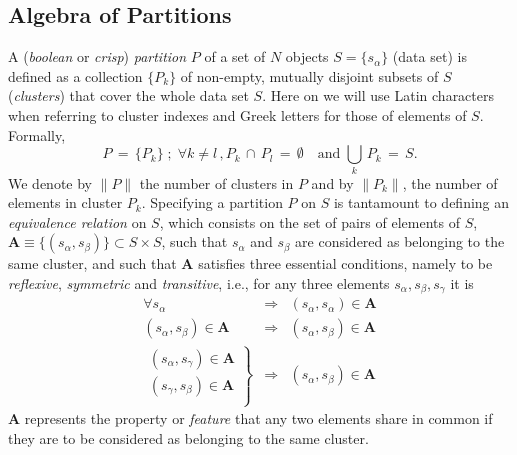 \documentclass[twocolumn,aps,sort,nofootinbib]{revtex4}
\begin{document}
\subsection{Algebra of Partitions}
A ({\it boolean} or {\it crisp}) {\it partition} $P$ 
of a set of $N$ objects $S=\{s_\alpha\}$ (data set) is defined as a collection $\{P_k\}$ of non-empty, 
mutually disjoint 
subsets of $S$ ({\sl clusters}) that cover the whole data set $S$. 
Here on we will use Latin characters when referring to
cluster indexes and Greek letters for those of elements of $S$.
Formally, 
\begin{equation*}
P\,=\,\{P_k\}\; ;\;\forall k\neq l\,, P_k\,\cap\,P_l\,=\,\emptyset\quad \text{and} \; \bigcup_k\,P_k\,=\,S.
\end{equation*}
We denote by $\|P\|$ the number of clusters in $P$ and by $\|P_k\|$, the number of elements in cluster
$P_k$.
Specifying a partition $P$ on $S$ is tantamount to defining an {\sl equivalence relation} 
on $S$,
which consists on the set of pairs of elements of $S$,
$\mathbf{A}\equiv\{(s_\alpha,s_\beta)\} \subset S\times S$,  
such that $s_\alpha$ and $s_\beta$ are considered as belonging to the same cluster,
and such that $\mathbf{A}$  satisfies
three essential conditions, namely to be {\sl reflexive}, {\sl symmetric} and {\sl transitive},
i.e., for any three elements $s_\alpha, s_\beta, s_\gamma$ it is
\begin{subequations}
\begin{eqnarray}
\forall s_\alpha &\Rightarrow & (s_\alpha , s_\alpha ) \in \mathbf{A} \\
(s_\alpha , s_\beta ) \in \mathbf{A} & \Rightarrow & (s_\alpha ,s_\beta )\in \mathbf{A} \\
\left.
\begin{matrix}
(s_\alpha , s_\gamma) \in \mathbf{A}\\ 
(s_\gamma , s_\beta) \in \mathbf{A}\\ 
\end{matrix}\right\}  & \Rightarrow & (s_\alpha,s_\beta) \in \mathbf{A}
\end{eqnarray}
\end{subequations}
$\mathbf{A}$ represents the property or {\sl feature} that any two elements share in common
if they are to be considered as belonging to the same cluster.
\end{document}
